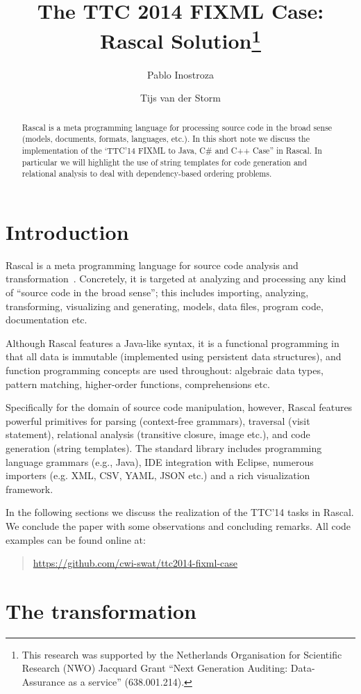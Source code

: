 \documentclass[submission,copyright,creativecommons]{eptcs}
\title{The TTC 2014 FIXML Case: Rascal Solution\thanks{This
    research was supported by the Netherlands Organisation for
    Scientific Research (NWO) Jacquard Grant ``Next Generation
    Auditing: Data-Assurance as a service'' (638.001.214).}}
\author{Pablo Inostroza \\
\institute{Centrum Wiskunde \&\ Informatica (CWI)\\ Amsterdam, The Netherlands}
\email{\href{mailto:pvaldera@cwi.nl}{pvaldera@cwi.nl}}
\and Tijs van der Storm\\
\institute{Centrum Wiskunde \&\ Informatica (CWI)\\ Amsterdam, The Netherlands}
\email{\href{mailto:storm@cwi.nl}{storm@cwi.nl}}
}
\begin{document}
\maketitle

\begin{abstract}
Rascal is a meta programming language for processing source code in
the broad sense (models, documents, formats, languages, etc.). In this
short note we discuss the implementation of the `TTC'14 FIXML to Java,
C\# and C++ Case'' in Rascal. In particular we will highlight the use
of string templates for code generation and relational analysis to deal with dependency-based ordering problems.
\end{abstract}

\section{Introduction}

Rascal is a meta programming language for source code analysis and transformation~\cite{Rascal,RascalGTTSE}. 
Concretely, it is targeted at analyzing and processing any kind of ``source code in the broad sense''; this includes importing, analyzing, transforming, visualizing and generating, models, data files, program code, documentation etc.
 
Although Rascal features a Java-like syntax, it is a functional programming in that all data is immutable (implemented using persistent data structures), and function programming concepts are used throughout: algebraic data types, pattern matching, higher-order functions, comprehensions etc. 

Specifically for the domain of source code manipulation, however, Rascal features powerful primitives for parsing (context-free grammars), traversal (visit statement), relational analysis (transitive closure, image etc.), and code generation (string templates). 
The standard library includes programming language grammars (e.g., Java), IDE integration
with Eclipse, numerous importers (e.g. XML, CSV, YAML, JSON etc.) and a rich visualization framework. 


In the following sections we discuss the realization of the TTC'14 tasks in Rascal. We conclude the paper with some observations and concluding remarks. 
All code examples  can be found  online at:
\begin{quote}
\url{https://github.com/cwi-swat/ttc2014-fixml-case}
\end{quote}

\section{The transformation}
\end{document}
